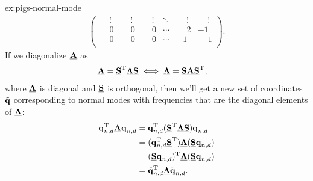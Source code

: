 \begin{DefAnswer}{ex:pigs-normal-mode}
\begin{align}
\begin{pmatrix}
				\phantom{-}\vdots & \phantom{-}\vdots & \phantom{-}\vdots & \ddots & \phantom{-}\vdots & \phantom{-}\vdots \\
				\phantom{-}0 & \phantom{-}0 & \phantom{-}0 & \cdots & \phantom{-}2 & -1 \\
				\phantom{-}0 & \phantom{-}0 & \phantom{-}0 & \cdots & -1 & \phantom{-}1 \\
			\end{pmatrix}.
				\label{eq:nm-matrix-full}
	\end{align}
	If we diagonalize $\underline{\bm{\mathbf{A}}}$ as
	\begin{align}
		\underline{\bm{\mathbf{A}}}
		= \underline{\bm{\mathbf{S}}}^\mathrm{T} \underline{\bm{\mathbf{\Lambda}}} \underline{\bm{\mathbf{S}}}
		&\iff
		\underline{\bm{\mathbf{\Lambda}}}
		= \underline{\bm{\mathbf{S}}} \underline{\bm{\mathbf{A}}} \underline{\bm{\mathbf{S}}}^\mathrm{T},
			\label{eq:nm-diagonalization}
	\end{align}
	where $\underline{\bm{\mathbf{\Lambda}}}$ is diagonal and $\underline{\bm{\mathbf{S}}}$ is orthogonal, then we'll get a new set of coordinates $\tilde{\bm{\mathbf{q}}}$ corresponding to normal modes with frequencies that are the diagonal elements of $\underline{\bm{\mathbf{\Lambda}}}$:
	\begin{subequations}
	\begin{align}
		\bm{\mathbf{q}}_{n,d}^\mathrm{T} \underline{\bm{\mathbf{A}}} \bm{\mathbf{q}}_{n,d}
		&= \bm{\mathbf{q}}_{n,d}^\mathrm{T} (\underline{\bm{\mathbf{S}}}^\mathrm{T} \underline{\bm{\mathbf{\Lambda}}} \underline{\bm{\mathbf{S}}}) \bm{\mathbf{q}}_{n,d} \\
		&= (\bm{\mathbf{q}}_{n,d}^\mathrm{T} \underline{\bm{\mathbf{S}}}^\mathrm{T}) \underline{\bm{\mathbf{\Lambda}}} (\underline{\bm{\mathbf{S}}} \bm{\mathbf{q}}_{n,d}) \\
		&= (\underline{\bm{\mathbf{S}}} \bm{\mathbf{q}}_{n,d})^\mathrm{T} \underline{\bm{\mathbf{\Lambda}}} (\underline{\bm{\mathbf{S}}} \bm{\mathbf{q}}_{n,d}) \\
		&= \tilde{\bm{\mathbf{q}}}_{n,d}^\mathrm{T} \underline{\bm{\mathbf{\Lambda}}} \tilde{\bm{\mathbf{q}}}_{n,d}.
	\end{align}
	\end{subequations}


\end{DefAnswer}
